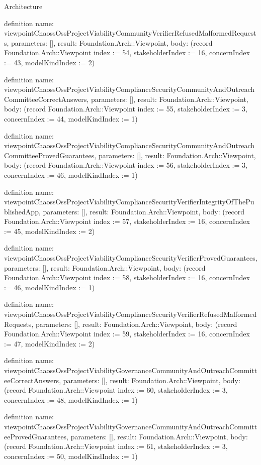 \begin{lexlean}{Architecture}
\begin{semanticmodule}
definition{
  name: viewpointChaossOssProjectViabilityCommunityVerifierRefusedMalformedRequests,
  parameters: [],
  result: Foundation.Arch::Viewpoint,
  body: (record Foundation.Arch::Viewpoint {index := 54, stakeholderIndex := 16, concernIndex := 43, modelKindIndex := 2})
}

definition{
  name: viewpointChaossOssProjectViabilityComplianceSecurityCommunityAndOutreachCommitteeCorrectAnswers,
  parameters: [],
  result: Foundation.Arch::Viewpoint,
  body: (record Foundation.Arch::Viewpoint {index := 55, stakeholderIndex := 3, concernIndex := 44, modelKindIndex := 1})
}

definition{
  name: viewpointChaossOssProjectViabilityComplianceSecurityCommunityAndOutreachCommitteeProvedGuarantees,
  parameters: [],
  result: Foundation.Arch::Viewpoint,
  body: (record Foundation.Arch::Viewpoint {index := 56, stakeholderIndex := 3, concernIndex := 46, modelKindIndex := 1})
}

definition{
  name: viewpointChaossOssProjectViabilityComplianceSecurityVerifierIntegrityOfThePublishedApp,
  parameters: [],
  result: Foundation.Arch::Viewpoint,
  body: (record Foundation.Arch::Viewpoint {index := 57, stakeholderIndex := 16, concernIndex := 45, modelKindIndex := 2})
}

definition{
  name: viewpointChaossOssProjectViabilityComplianceSecurityVerifierProvedGuarantees,
  parameters: [],
  result: Foundation.Arch::Viewpoint,
  body: (record Foundation.Arch::Viewpoint {index := 58, stakeholderIndex := 16, concernIndex := 46, modelKindIndex := 1})
}

definition{
  name: viewpointChaossOssProjectViabilityComplianceSecurityVerifierRefusedMalformedRequests,
  parameters: [],
  result: Foundation.Arch::Viewpoint,
  body: (record Foundation.Arch::Viewpoint {index := 59, stakeholderIndex := 16, concernIndex := 47, modelKindIndex := 2})
}

definition{
  name: viewpointChaossOssProjectViabilityGovernanceCommunityAndOutreachCommitteeCorrectAnswers,
  parameters: [],
  result: Foundation.Arch::Viewpoint,
  body: (record Foundation.Arch::Viewpoint {index := 60, stakeholderIndex := 3, concernIndex := 48, modelKindIndex := 1})
}

definition{
  name: viewpointChaossOssProjectViabilityGovernanceCommunityAndOutreachCommitteeProvedGuarantees,
  parameters: [],
  result: Foundation.Arch::Viewpoint,
  body: (record Foundation.Arch::Viewpoint {index := 61, stakeholderIndex := 3, concernIndex := 50, modelKindIndex := 1})
}


\end{semanticmodule}
\end{lexlean}
